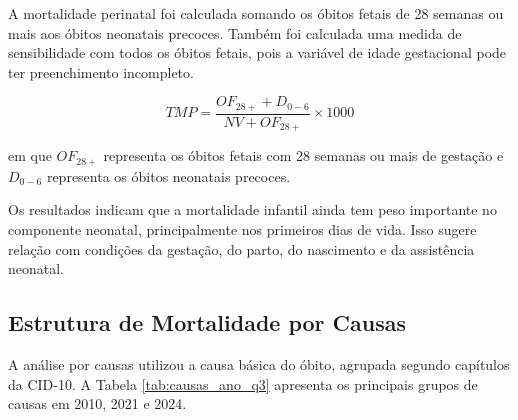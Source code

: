 A mortalidade perinatal foi calculada somando os óbitos fetais de 28 semanas ou mais aos óbitos neonatais precoces. Também foi calculada uma medida de sensibilidade com todos os óbitos fetais, pois a variável de idade gestacional pode ter preenchimento incompleto.

\[
TMP = \frac{OF_{28+} + D_{0-6}}{NV + OF_{28+}} \times 1000
\]

em que $OF_{28+}$ representa os óbitos fetais com 28 semanas ou mais de gestação e $D_{0-6}$ representa os óbitos neonatais precoces.

\begin{table}[H]
\centering
\small
\caption{Taxa de Mortalidade Perinatal. Amapá.}
\label{tab:perinatal_q3}
\end{table}

Os resultados indicam que a mortalidade infantil ainda tem peso importante no componente neonatal, principalmente nos primeiros dias de vida. Isso sugere relação com condições da gestação, do parto, do nascimento e da assistência neonatal.

\subsection{Estrutura de Mortalidade por Causas}

A análise por causas utilizou a causa básica do óbito, agrupada segundo capítulos da CID-10. A Tabela \ref{tab:causas_ano_q3} apresenta os principais grupos de causas em 2010, 2021 e 2024.

